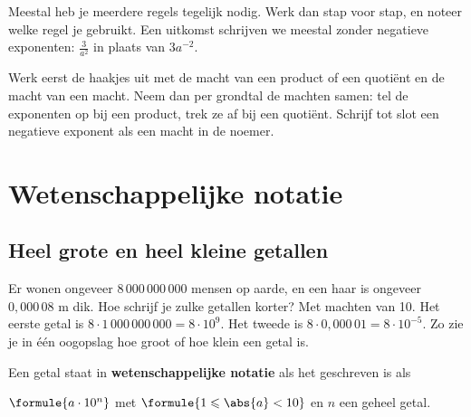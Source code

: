 Meestal heb je meerdere regels tegelijk nodig. Werk dan stap voor stap, en noteer welke regel je gebruikt. Een uitkomst schrijven we meestal zonder negatieve exponenten: $\tfrac{3}{a^2}$ in plaats van $3a^{-2}$.


\begin{werkwijze}
Werk eerst de haakjes uit met de macht van een product of een quotiënt en de macht van een macht. Neem dan per grondtal de machten samen: tel de exponenten op bij een product, trek ze af bij een quotiënt. Schrijf tot slot een negatieve exponent als een macht in de noemer.
\end{werkwijze}

\begin{oefeningen}
\end{oefeningen}

\section{Wetenschappelijke notatie}

\subsection{Heel grote en heel kleine getallen}

Er wonen ongeveer $8\,000\,000\,000$ mensen op aarde, en een haar is ongeveer $0,000\,08$ m dik. Hoe schrijf je zulke getallen korter? Met machten van 10. Het eerste getal is $8 \cdot 1\,000\,000\,000 = 8 \cdot 10^{9}$. Het tweede is $8 \cdot 0,000\,01 = 8 \cdot 10^{-5}$. Zo zie je in één oogopslag hoe groot of hoe klein een getal is.

\begin{theorie}
Een getal staat in \textbf{\textcolor{accent}{wetenschappelijke notatie}} als het geschreven is als

\vspace{1mm}
\qquad $\formule{a \cdot 10^n}$ \qquad met $\formule{1 \leqslant \abs{a} < 10}$ en $n$ een geheel getal.
\end{theorie}

